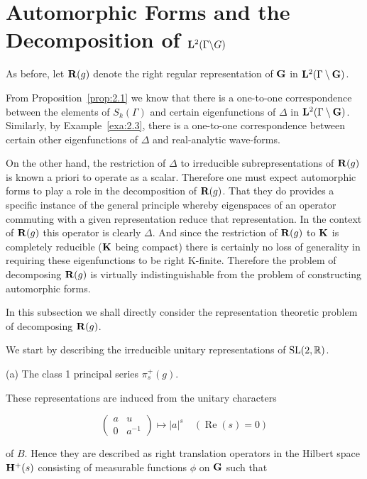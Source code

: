 \section{Automorphic Forms and the Decomposition of \texorpdfstring{$\mathbf{L}^2(\Gamma\backslash G)$}{L2(Gamma G)}}\label{sec:2b}

As before, let $\mathbf{R}(g)$ denote the right regular representation of $\mathbf{G}$ in $\mathbf{L}^2(\Gamma \setminus \mathbf{G})$.

From Proposition~\ref{prop:2.1} we know that there is a one-to-one correspondence between the elements of $S_k(\Gamma)$ and certain eigenfunctions of $\Delta$ in $\mathbf{L}^2(\Gamma \setminus \mathbf{G})$. Similarly, by Example~\ref{exa:2.3}, there is a one-to-one correspondence between certain other eigenfunctions of $\Delta$ and real-analytic wave-forms.

On the other hand, the restriction of $\Delta$ to irreducible subrepresentations of $\mathbf{R}(g)$ is known a priori to operate as a scalar. Therefore one must expect automorphic forms to play a role in the decomposition of $\mathbf{R}(g)$. That they do provides a specific instance of the general principle whereby eigenspaces of an operator commuting with a given representation reduce that representation. In the context of $\mathbf{R}(g)$ this operator is clearly $\Delta$. And since the restriction of $\mathbf{R}(g)$ to $\mathbf{K}$ is completely reducible ($\mathbf{K}$ being compact) there is certainly no loss of generality in requiring these eigenfunctions to be right K-finite. Therefore the problem of decomposing $\mathbf{R}(g)$ is virtually indistinguishable from the problem of constructing automorphic forms.

In this subsection we shall directly consider the representation theoretic problem of decomposing $\mathbf{R}(g)$.

We start by describing the irreducible unitary representations of $\operatorname{SL}(2,\mathbb{R})$.

(a) The class 1 principal series $\pi_s^{+}(g)$.

These representations are induced from the unitary characters

\begin{equation}\label{eq:2.17}
\begin{pmatrix} a & u \\ 0 & a^{-1} \end{pmatrix} \mapsto |a|^{s} \quad (\operatorname{Re}(s) = 0)\tag{2.17}
\end{equation}

of $B$. Hence they are described as right translation operators in the Hilbert space $\mathbf{H}^{+}(s)$ consisting of measurable functions $\phi$ on $\mathbf{G}$ such that


